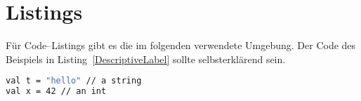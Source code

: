 \section{Listings}
\label{sec:listings}

Für Code--Listings gibt es die im folgenden verwendete Umgebung. Der Code des
Beispiels in Listing~\ref{DescriptiveLabel} sollte selbsterklärend sein.

\begin{lstlisting}[language=sh,tabsize=2,caption=Descriptive Caption Text,label=DescriptiveLabel]
val t = "hello" // a string
val x = 42 // an int
\end{lstlisting}
